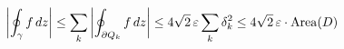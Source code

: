 \documentclass[preview]{standalone}
\begin{document}
\begin{align*}
\special{dvisvgm:raw <g id='unique000'>}\left| \oint_{\gamma} f\,dz \right| \le \sum_{k} \left| \oint_{\partial Q_k} f\,dz \right| \le 4\sqrt{2}\,\varepsilon \sum_{k} \delta_k^{2} \le 4\sqrt{2}\,\varepsilon \cdot \mathrm{Area}(D)\special{dvisvgm:raw </g>}
\end{align*}
\end{document}
